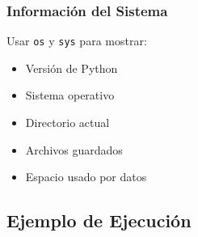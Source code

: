 \documentclass[12pt,a4paper]{article}
\begin{document}
\subsubsection{Información del Sistema}

Usar \texttt{os} y \texttt{sys} para mostrar:
\begin{itemize}
    \item Versión de Python
    \item Sistema operativo
    \item Directorio actual
    \item Archivos guardados
    \item Espacio usado por datos
\end{itemize}

\newpage

\subsection{Ejemplo de Ejecución}
\end{document}
